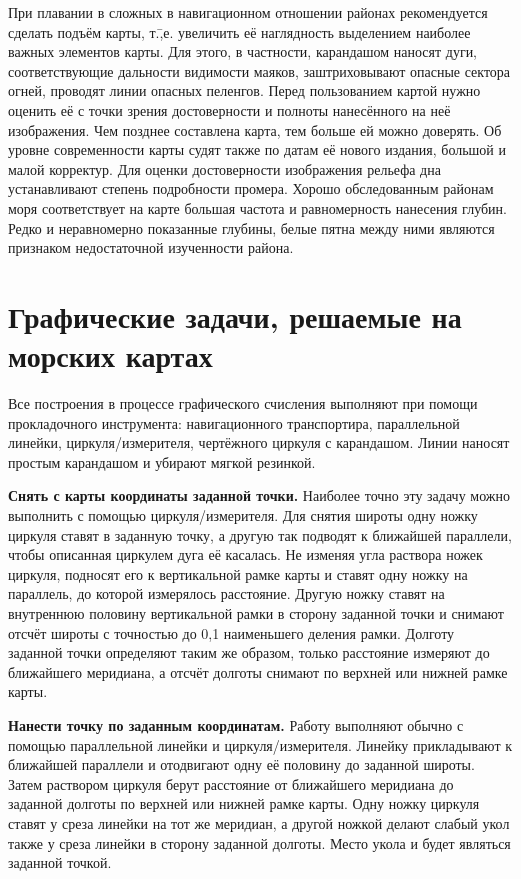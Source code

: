 При плавании в сложных в навигационном отношении районах рекомендуется
сделать подъём карты, т.\=,е. увеличить её
наглядность выделением наиболее важных элементов карты. Для этого, в
частности, карандашом наносят дуги, соответствующие дальности
видимости маяков, заштриховывают опасные сектора огней, проводят линии
опасных пеленгов. Перед пользованием картой нужно оценить её с точки
зрения достоверности и полноты нанесённого на неё изображения. Чем
позднее составлена карта, тем больше ей можно доверять. Об уровне
современности карты судят также по датам её нового издания, большой и
малой корректур. Для оценки достоверности изображения рельефа дна
устанавливают степень подробности промера. Хорошо обследованным
районам моря соответствует на карте большая частота и равномерность
нанесения глубин. Редко и неравномерно показанные глубины, белые пятна
между ними являются признаком недостаточной изученности района.

\section{Графические задачи, решаемые на морских картах}

Все построения в процессе графического счисления выполняют при помощи
прокладочного инструмента: навигационного транспортира, параллельной
линейки, циркуля\-/измерителя, чертёжного циркуля с карандашом. Линии
наносят простым карандашом и убирают мягкой резинкой.

\textbf{Снять с карты координаты заданной точки.} Наиболее точно эту
задачу можно выполнить с помощью циркуля\-/измерителя. Для снятия
широты одну ножку циркуля ставят в заданную точку, а другую так
подводят к ближайшей параллели, чтобы описанная циркулем дуга её
касалась. Не изменяя угла раствора ножек циркуля, подносят его к
вертикальной рамке карты и ставят одну ножку на параллель, до которой
измерялось расстояние. Другую ножку ставят на внутреннюю половину
вертикальной рамки в сторону заданной точки и снимают отсчёт широты с
точностью до 0,1 наименьшего деления рамки. Долготу заданной точки
определяют таким же образом, только расстояние измеряют до ближайшего
меридиана, а отсчёт долготы снимают по верхней или нижней рамке карты.

\textbf{Нанести точку по заданным координатам.} Работу выполняют
обычно с помощью параллельной линейки и циркуля\-/измерителя. Линейку
прикладывают к ближайшей параллели и отодвигают одну её половину до
заданной широты. Затем раствором циркуля берут расстояние от
ближайшего меридиана до заданной долготы по верхней или нижней рамке
карты. Одну ножку циркуля ставят у среза линейки на тот же меридиан, а
другой ножкой делают слабый укол также у среза линейки в сторону
заданной долготы. Место укола и будет являться заданной точкой.

